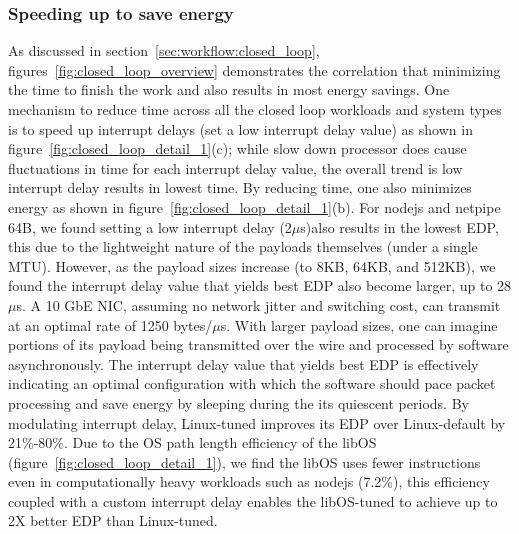 
\subsubsection{Speeding up to save energy}
As discussed in section~\ref{sec:workflow:closed_loop}, figures~\ref{fig:closed_loop_overview} demonstrates the correlation that minimizing the time to finish the work and also results in most energy savings. One mechanism to reduce time across all the closed loop workloads and system types is to speed up interrupt delays (set a low interrupt delay value) as shown in figure~\ref{fig:closed_loop_detail_1}(c); while slow down processor does cause fluctuations in time for each interrupt delay value, the overall trend is low interrupt delay results in lowest time. By reducing time, one also minimizes energy as shown in figure~\ref{fig:closed_loop_detail_1}(b). For nodejs and netpipe 64B, we found setting a low interrupt delay (2$\mu$s)also results in the lowest EDP, this due to the lightweight nature of the payloads themselves (under a single MTU). However, as the payload sizes increase (to 8KB, 64KB, and 512KB), we found the interrupt delay value that yields best EDP also become larger, up to 28$\mu$s. A 10 GbE NIC, assuming no network jitter and switching cost, can transmit at an optimal rate of 1250 bytes/$\mu$s. With larger payload sizes, one can imagine portions of its payload being transmitted over the wire and processed by software asynchronously. The interrupt delay value that yields best EDP is effectively indicating an optimal configuration with which the software should pace packet processing and save energy by sleeping during the its quiescent periods. By modulating interrupt delay, Linux-tuned improves its EDP over Linux-default by 21\%-80\%. Due to the OS path length efficiency of the libOS (figure~\ref{fig:closed_loop_detail_1}), we find the libOS uses fewer instructions even in computationally heavy workloads such as nodejs (7.2\%), this efficiency coupled with a custom interrupt delay enables the libOS-tuned to achieve up to 2X better EDP than Linux-tuned.


